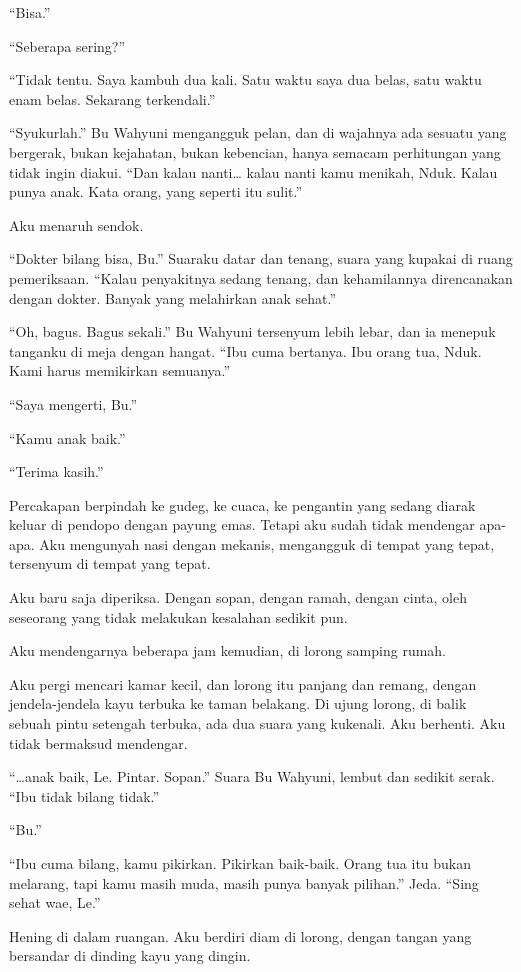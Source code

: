 \documentclass[11pt,twoside,openany]{book}
\makeatletter
\newcommand{\scenebreak}{\par\vspace{0.9em}{\centering\textsc{*\hspace{0.7em}*\hspace{0.7em}*}\par}\vspace{0.9em}\@afterindentfalse\@afterheading}
\makeatother
\begin{document}
``Bisa.''

``Seberapa sering?''

``Tidak tentu. Saya kambuh dua kali. Satu waktu saya dua belas, satu waktu enam belas. Sekarang terkendali.''

``Syukurlah.'' Bu Wahyuni mengangguk pelan, dan di wajahnya ada sesuatu yang bergerak, bukan kejahatan, bukan kebencian, hanya semacam perhitungan yang tidak ingin diakui. ``Dan kalau nanti\ldots{} kalau nanti kamu menikah, Nduk. Kalau punya anak. Kata orang, yang seperti itu sulit.''

Aku menaruh sendok.

``Dokter bilang bisa, Bu.'' Suaraku datar dan tenang, suara yang kupakai di ruang pemeriksaan. ``Kalau penyakitnya sedang tenang, dan kehamilannya direncanakan dengan dokter. Banyak yang melahirkan anak sehat.''

``Oh, bagus. Bagus sekali.'' Bu Wahyuni tersenyum lebih lebar, dan ia menepuk tanganku di meja dengan hangat. ``Ibu cuma bertanya. Ibu orang tua, Nduk. Kami harus memikirkan semuanya.''

``Saya mengerti, Bu.''

``Kamu anak baik.''

``Terima kasih.''

Percakapan berpindah ke gudeg, ke cuaca, ke pengantin yang sedang diarak keluar di pendopo dengan payung emas. Tetapi aku sudah tidak mendengar apa-apa. Aku mengunyah nasi dengan mekanis, mengangguk di tempat yang tepat, tersenyum di tempat yang tepat.

Aku baru saja diperiksa. Dengan sopan, dengan ramah, dengan cinta, oleh seseorang yang tidak melakukan kesalahan sedikit pun.

\scenebreak
Aku mendengarnya beberapa jam kemudian, di lorong samping rumah.

Aku pergi mencari kamar kecil, dan lorong itu panjang dan remang, dengan jendela-jendela kayu terbuka ke taman belakang. Di ujung lorong, di balik sebuah pintu setengah terbuka, ada dua suara yang kukenali. Aku berhenti. Aku tidak bermaksud mendengar.

``\ldots anak baik, Le. Pintar. Sopan.'' Suara Bu Wahyuni, lembut dan sedikit serak. ``Ibu tidak bilang tidak.''

``Bu.''

``Ibu cuma bilang, kamu pikirkan. Pikirkan baik-baik. Orang tua itu bukan melarang, tapi kamu masih muda, masih punya banyak pilihan.'' Jeda. ``Sing sehat wae, Le.''

Hening di dalam ruangan. Aku berdiri diam di lorong, dengan tangan yang bersandar di dinding kayu yang dingin.
\end{document}
